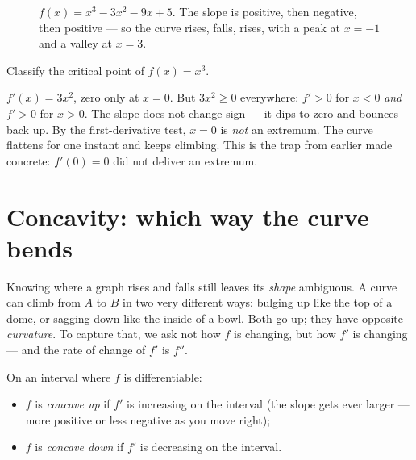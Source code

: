 \begin{figure}[H]
\centering
{}
\caption{$f(x)=x^3-3x^2-9x+5$. The slope is positive, then negative, then positive
--- so the curve rises, falls, rises, with a peak at $x=-1$ and a valley at $x=3$.}
\label{ch16:fig-cubic}
\end{figure}

\begin{example}\label{ch16:ex-no-extremum}
Classify the critical point of $f(x)=x^3$.

\smallskip
$f'(x)=3x^2$, zero only at $x=0$. But $3x^2\ge 0$ everywhere: $f'>0$ for $x<0$
\emph{and} $f'>0$ for $x>0$. The slope does not change sign --- it dips to zero and
bounces back up. By the first-derivative test, $x=0$ is \emph{not} an extremum. The
curve flattens for one instant and keeps climbing. This is the trap from earlier
made concrete: $f'(0)=0$ did not deliver an extremum.
\end{example}

\section{Concavity: which way the curve bends}

Knowing where a graph rises and falls still leaves its \emph{shape} ambiguous. A
curve can climb from $A$ to $B$ in two very different ways: bulging up like the top
of a dome, or sagging down like the inside of a bowl. Both go up; they have
opposite \emph{curvature}. To capture that, we ask not how $f$ is changing, but how
$f'$ is changing --- and the rate of change of $f'$ is $f''$.

\begin{definition}[Concavity]\label{ch16:def-concave}
On an interval where $f$ is differentiable:
\begin{itemize}
\item $f$ is \emph{concave up} if $f'$ is increasing on the interval (the slope
gets ever larger --- more positive or less negative as you move right);
\item $f$ is \emph{concave down} if $f'$ is decreasing on the interval.
\end{itemize}
\end{definition}

